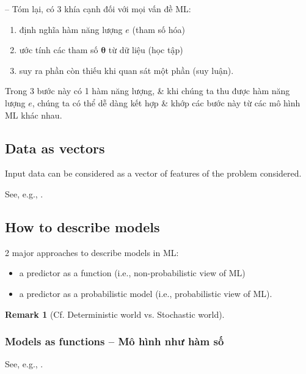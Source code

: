 \documentclass{article}
\newtheorem{remark}{Remark}
\begin{document}
-- Tóm lại, có 3 khía cạnh đối với mọi vấn đề ML:
\begin{enumerate}
	\item định nghĩa hàm năng lượng $e$ (tham số hóa)
	\item ước tính các tham số $\boldsymbol{\theta}$ từ dữ liệu (học tập)
	\item suy ra phần còn thiếu khi quan sát một phần (suy luận).
\end{enumerate}
Trong 3 bước này có 1 hàm năng lượng, \& khi chúng ta thu được hàm năng lượng $e$, chúng ta có thể dễ dàng kết hợp \& khớp các bước này từ các mô hình ML khác nhau.


\subsection{Data as vectors}
Input data can be considered as a vector of features of the problem considered.

See, e.g., \cite[Chap. 8, Sect. 8.1.1: Data as Vectors]{Deisenroth_Faisal_Ong2024}.


\subsection{How to describe models}
2 major approaches to describe models in ML:
\begin{itemize}
	\item a predictor as a function (i.e., non-probabilistic view of ML)
	\item a predictor as a probabilistic model (i.e., probabilistic view of ML).
\end{itemize}

\begin{remark}[Cf. Deterministic world vs. Stochastic world]
	
\end{remark}


\subsubsection{Models as functions -- Mô hình như hàm số}
See, e.g., \cite[Chap. 8, Sect. 8.1.2: Models as Functions]{Deisenroth_Faisal_Ong2024}.
\end{document}
